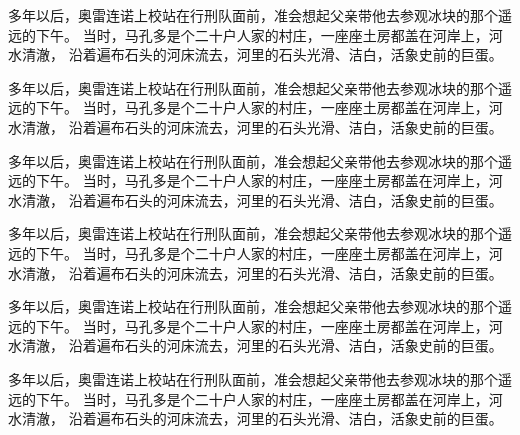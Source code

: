 \documentclass[UTF8]{ctexart}
\begin{document}
多年以后，奥雷连诺上校站在行刑队面前，准会想起父亲带他去参观冰块的那个遥远的下午。
当时，马孔多是个二十户人家的村庄，一座座土房都盖在河岸上，河水清澈，
沿着遍布石头的河床流去，河里的石头光滑、洁白，活象史前的巨蛋。

多年以后，奥雷连诺上校站在行刑队面前，准会想起父亲带他去参观冰块的那个遥远的下午。
当时，马孔多是个二十户人家的村庄，一座座土房都盖在河岸上，河水清澈，
沿着遍布石头的河床流去，河里的石头光滑、洁白，活象史前的巨蛋。

多年以后，奥雷连诺上校站在行刑队面前，准会想起父亲带他去参观冰块的那个遥远的下午。
当时，马孔多是个二十户人家的村庄，一座座土房都盖在河岸上，河水清澈，
沿着遍布石头的河床流去，河里的石头光滑、洁白，活象史前的巨蛋。
 
\singlespacing 
多年以后，奥雷连诺上校站在行刑队面前，准会想起父亲带他去参观冰块的那个遥远的下午。
当时，马孔多是个二十户人家的村庄，一座座土房都盖在河岸上，河水清澈，
沿着遍布石头的河床流去，河里的石头光滑、洁白，活象史前的巨蛋。

\onehalfspacing 
多年以后，奥雷连诺上校站在行刑队面前，准会想起父亲带他去参观冰块的那个遥远的下午。
当时，马孔多是个二十户人家的村庄，一座座土房都盖在河岸上，河水清澈，
沿着遍布石头的河床流去，河里的石头光滑、洁白，活象史前的巨蛋。


\doublespacing 
多年以后，奥雷连诺上校站在行刑队面前，准会想起父亲带他去参观冰块的那个遥远的下午。
当时，马孔多是个二十户人家的村庄，一座座土房都盖在河岸上，河水清澈，
沿着遍布石头的河床流去，河里的石头光滑、洁白，活象史前的巨蛋。
\end{document}
